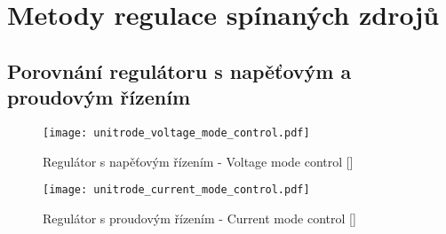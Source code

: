     

  \section{Metody regulace spínaných zdrojů}\label{aes:sec008}
    \subsection{Porovnání regulátoru s napěťovým a proudovým řízením}
      \begin{figure}[ht!]
        \centering
        \texttt{[image: unitrode\_voltage\_mode\_control.pdf]}
        \caption[Regulátor s napěťovým řízením]{Regulátor s napěťovým řízením - Voltage mode
                 control [\cite{SLUA119}]}
        \label{ENZ:fig_V_mode_cntrl}
      \end{figure}
  
  
      \begin{figure}[ht!]
        \centering
        \texttt{[image: unitrode\_current\_mode\_control.pdf]}
        \caption[Regulátor s proudovým řízením]{Regulátor s proudovým řízením - Current mode
                 control [\cite{SLUA119}]}
        \label{ENZ:fig_I_mode_cntrl}
      \end{figure}
  
